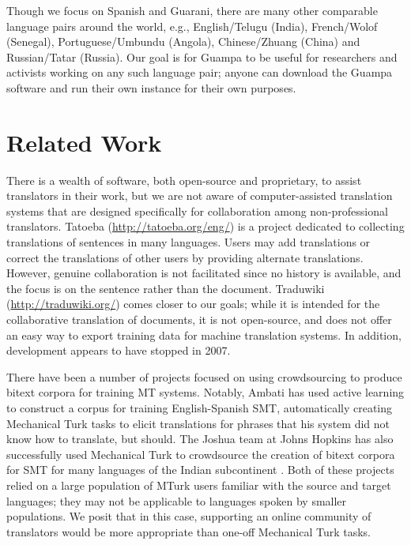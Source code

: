 \documentclass[10pt, a4paper]{article}
\begin{document}
Though we focus on Spanish and Guarani, there are many other comparable
language pairs around the world, e.g., English/Telugu (India), French/Wolof
(Senegal), Portuguese/Umbundu (Angola), Chinese/Zhuang (China) and
Russian/Tatar (Russia). Our goal is for Guampa to be useful for researchers and
activists working on any such language pair; anyone can download the Guampa
software and run their own instance for their own purposes.

\section{Related Work}
There is a wealth of software, both open-source and proprietary, to assist
translators in their work, but we are not aware of computer-assisted
translation systems that are designed specifically for collaboration among
non-professional translators. Tatoeba (\url{http://tatoeba.org/eng/}) is a
project dedicated to collecting translations of sentences in many languages.
Users may add translations or correct the translations of other users by
providing alternate translations. However, genuine collaboration is not
facilitated since no history is available, and the focus is on the sentence
rather than the document. Traduwiki (\url{http://traduwiki.org/}) comes closer
to our goals; while it is intended for the collaborative translation of
documents, it is not open-source, and does not offer an easy way to export
training data for machine translation systems. In addition, development appears
to have stopped in 2007.

There have been a number of projects focused on using crowdsourcing to produce
bitext corpora for training MT systems. Notably, Ambati
\cite{ambati_naacl,ambati_act} has used active learning to construct a corpus
for training English-Spanish SMT, automatically creating Mechanical Turk tasks
to elicit translations for phrases that his system did not know how to
translate, but should. The Joshua team at Johns Hopkins has also successfully
used Mechanical Turk to crowdsource the creation of bitext corpora for SMT for
many languages of the Indian subcontinent
\cite{post-callisonburch-osborne:2012:WMT}. Both of these projects relied on a
large population of MTurk users familiar with the source and target languages;
they may not be applicable to languages spoken by smaller populations. We posit
that in this case, supporting an online community of translators would be more
appropriate than one-off Mechanical Turk tasks.
\end{document}
